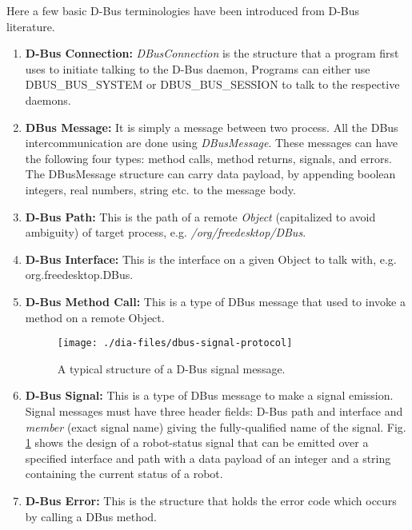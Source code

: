 Here a few basic D-Bus terminologies have been introduced from D-Bus literature.
\begin{enumerate}
\item \textbf{D-Bus Connection: }
\textit{DBusConnection} is the structure that a program first uses to initiate talking to the D-Bus daemon, Programs can either use\\ DBUS\_BUS\_SYSTEM or DBUS\_BUS\_SESSION to talk to the respective daemons.
\item \textbf{DBus Message: }
It is simply a message between two process. All the DBus intercommunication are done using \textit{DBusMessage}. These messages can have the following four types: method calls, method returns, signals, and errors. The DBusMessage structure can carry data payload, by appending boolean integers, real numbers, string etc. to the message body.
\item \textbf{D-Bus Path: }
This is the path of a remote \textit{Object} (capitalized to avoid ambiguity) of target process, e.g. \textit{/org/freedesktop/DBus}.\\
\item \textbf{D-Bus Interface: }
This is the interface on a given Object to talk with, e.g. org.freedesktop.DBus.
%
\item \textbf{D-Bus Method Call: }
This is a type of DBus message that used to invoke a method on a remote Object.
%
\begin{figure}[H]
\begin{center}
\texttt{[image: ./dia-files/dbus-signal-protocol]} 
\caption{A typical structure of a D-Bus signal message.} 
\label{fig:dbus-signal-protocol}
\end{center}
\end{figure}
\item \textbf{D-Bus Signal: }
This is a type of DBus message to make a signal emission. Signal messages must have three header fields: D-Bus path and interface and {\em member} (exact signal name) giving the fully-qualified name of the signal. Fig. \ref{fig:dbus-signal-protocol}  shows the design of a robot-status signal that can be emitted over a specified interface and path with a data payload of an integer and a string containing the current status of a robot.
%
\item \textbf{D-Bus Error: }
This is the structure that holds the error code which occurs by calling a DBus method.
\end{enumerate}
